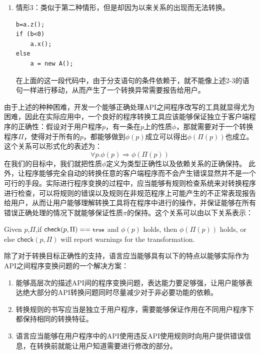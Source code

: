 \begin{enumerate}
\item 情形3：类似于第二种情形，但是却因为以来关系的出现而无法转换。
\begin{center}
\begin{smpage}{0.44\columnwidth}
\begin{lstlisting}[style=java,frame=none, numbers=none]
b=a.z();
if (b<0) 
	a.x();
else
	a = new A();
\end{lstlisting}
\end{smpage}
\end{center}
在上面的这一段代码中，由于分支语句的条件依赖于，就不能像上述2-3的语句一样进行移动，从而产生了一个转换异常需要报告给用户。
\end{enumerate}

由于上述的种种困难，开发一个能够正确处理API之间程序改写的工具就显得尤为困难，因此在实际应用中，一个良好的程序转换工具应该能够保证独立于客户端程序的正确性：假设对于用户程序$p$，有一条在$p$上的性质$\phi$，那就需要对于一个转换程序$\Pi$，使得对于所有的$p$，都能够做到$\phi(p)$成立可以得出$\phi(\Pi(p))$也成立。这个关系可以形式化的表述为：
$$\forall p.\phi(p)\Longrightarrow\phi(\Pi(p))$$
在我们的目标中，我们就把性质$\phi$定义为类型正确性以及依赖关系的正确保持。
此外，让程序能够完全自动的转换任意的客户端程序而不会产生错误显然并不是一个可行的手段。实际进行程序变换的过程中，应当能够有规则检查系统来对转换程序进行检查，可以将规则的错误以及规则在非规范程序上可能产生的不正常表现报告给用户，从而让用户能够理解转换工具将在程序中进行的操作，并保证能够在所有错误正确处理的情况下就能够保证性质$\pi$的保持。这个关系可以由以下关系表示：

\begin{property}
Given $p$,$\Pi$,if $\mathsf{check}(p,\Pi)==\texttt{\footnotesize true}$ and $\phi(p)$ holds, then $\phi(\Pi(p))$ holds, or else $\mathsf{check}(p,\Pi)$ will report warnings for the transformation.
\end{property}

除了对于转换目标正确性的支持，语言应当能够具有以下的特点以能够实际作为API之间程序变换问题的一个解决方案：
\begin{enumerate}
\item 能够高层次的描述API间的程序变换问题，表达能力要足够强，让用户能够表达绝大部分的API转换问题同时尽量减少对于非必要功能的依赖。
\item 转换规则的书写应当是独立于用户程序，需要能够保证作用在不同用户程序下都保持相同的转换特征。
\item 语言应当能够在用户程序中的API使用违反API使用规则时向用户提供错误信息，在转换前就能让用户知道需要进行修改的部分。
\end{enumerate}

